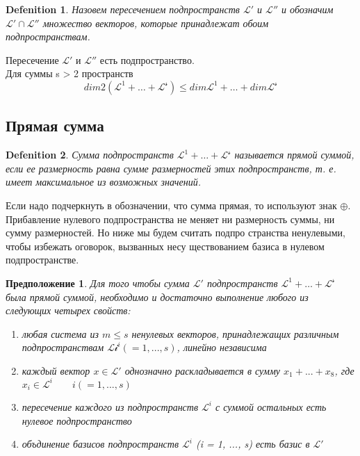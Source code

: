 \documentclass[11pt; a4paper]{report}
\theoremstyle{plain} %
\newtheorem{sug}{Предположение}[section]
\theoremstyle{defenition}
\newtheorem{glob_def}{Defenition}
\theoremstyle{remark}
\begin{document}
\begin{glob_def}
Назовем пересечением подпространств $\mathscr{L'}$ и $\mathscr{L''}$ и обозначим
 $\mathscr{L'} \cap \mathscr{L''}$ множество векторов, которые принадлежат обо­им подпространствам.\end{glob_def}
Пересечение $\mathscr{L'}$ и $\mathscr{L''}$ есть подпространство. \\
Для суммы s > 2 пространств
\begin{equation*}
dim2( \mathscr{L^1}+\ldots+\mathscr{L^s}) \leq dim\mathscr{L^1}+\ldots+dim\mathscr{L^s}
\end{equation*}



\subsection{Прямая сумма}
\begin{glob_def}
Сумма подпространств $\mathscr{L^1}+\ldots+\mathscr{L^s}$ называется прямой суммой,
 если ее размерность равна сумме размерностей этих подпространств, 
 т. е. имеет максимальное из возможных значений.
\end{glob_def}
Если надо подчеркнуть в обозначении, что сумма прямая, то ис­пользуют знак $\oplus$.\\

Прибавление нулевого подпространства не меняет ни размерность суммы, ни сумму размерностей.
 Но ниже мы будем считать подпро­ странства ненулевыми, чтобы избежать оговорок, вызванных несу­ ществованием базиса в нулевом подпространстве.

\begin{sug}\label{sug6.2.5}
Для того чтобы сумма  $\mathscr{L'}$ подпространств $\mathscr{L^1}+\ldots+\mathscr{L^s}$ 
была прямой суммой, необходимо и достаточно выполнение любого из следующих четырех свойств: 
   \begin{enumerate}
    \item любая система из $m\leq s$ ненулевых векторов, принадлежащих различным подпространствам 
     $\mathscr{Li}^ i( = 1, ..., s)$, линейно независима
    \item каждый вектор $x  \in \mathscr{L'}$ однозначно раскладывается в сумму $x_1+...+x_8$, 
    где $x_i \in  \mathscr{L}^i\qquad i( =1,...,s)$
    \item пересечение каждого из подпространств $\mathscr{L}^i$ с суммой остальных есть 
    нулевое подпространство
    \item объдинение базисов подпространств $\mathscr{L}^i$ (i = 1, ..., s) есть базис в $\mathscr{L'}$
    \end{enumerate}
\end{sug}
\end{document}
